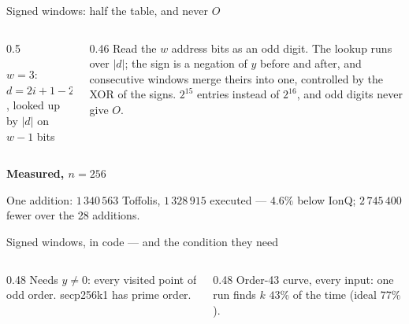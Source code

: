 \documentclass[aspectratio=169,11pt]{beamer}
\newcommand{\peachtitle}[1]{{\bfseries\color{cverm}#1}\par\vskip1mm}
\newcommand{\code}[2][]{}
\begin{document}
\setcounter{framenumber}{177}
\begin{frame}{Signed windows: half the table, and never $O$}
  \begin{columns}[c]
    \begin{column}{0.5\textwidth}
      \centering
      \par
      \vskip1mm
      {\scriptsize $w=3$: $d=2i+1-2^w$, looked up by $|d|$ on $w-1$ bits}
    \end{column}
    \begin{column}{0.46\textwidth}
      \small Read the $w$ address bits as an odd digit. The lookup runs over $|d|$; the sign is a negation of $y$ before and after, and consecutive windows merge theirs into one, controlled by the XOR of the signs.
      \vskip2mm
      $2^{15}$ entries instead of $2^{16}$, and odd digits never give $O$.
    \end{column}
  \end{columns}
  \vskip3mm
  \begin{peachblock}[fontupper=\small]\peachtitle{Measured, $n=256$}
    One addition: $1\,340\,563$ Toffolis, $1\,328\,915$ executed --- $4.6\%$ below IonQ; $2\,745\,400$ fewer over the 28 additions.
  \end{peachblock}
\end{frame}

\setcounter{framenumber}{178}
\begin{frame}[fragile]{Signed windows, in code --- and the condition they need}
  \code[basicstyle=\ttfamily\fontsize{7.6}{8.8}\selectfont]{signed.py}
  \begin{columns}[T]
    \begin{column}{0.48\textwidth}
      {\small Needs $y\neq0$: every visited point of odd order. secp256k1 has prime order.}
    \end{column}
    \begin{column}{0.48\textwidth}
      {\small Order-43 curve, every input: one run finds $k$ $43\%$ of the time (ideal $77\%$).}
    \end{column}
  \end{columns}
\end{frame}
\end{document}
